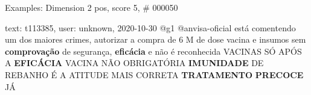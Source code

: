 \begin{frame}{Examples: Dimension 2 pos, score 5, \# 000050}
\footnotesize
\begin{exampleblock}{text: t113385, user: unknown, 2020-10-30}
@g1 @anvisa-oficial está comentendo um dos maiores crimes, autorizar a compra 
de 6 M de dose vacina e insumos sem \textbf{comprovação} de segurança, 
\textbf{eficácia} e não é reconhecida VACINAS SÓ APÓS A \textbf{EFICÁCIA} 
VACINA NÃO OBRIGATÓRIA \textbf{IMUNIDADE} DE REBANHO É A ATITUDE MAIS CORRETA 
\textbf{TRATAMENTO} \textbf{PRECOCE} JÁ 
\end{exampleblock}
\end{frame}
